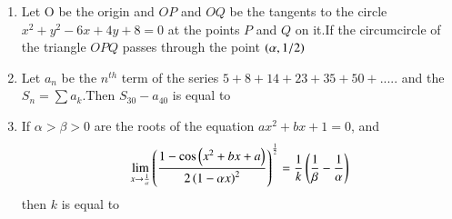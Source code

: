 \documentclass[journal]{IEEEtran}
\numberwithin{equation}{enumi}
\numberwithin{figure}{enumi}
\begin{document}
\begin{enumerate}
        \item Let O be the origin and $OP$ and $OQ$ be the tangents to the circle $x^2+y^2-6x+4y+8=0$ at the points $P$ and $Q$ on it.If the circumcircle of the triangle $OPQ$ passes through the point $\left(\alpha,1/2\right)$  \hfill{}\\
       \begin{enumerate}    
              \end{enumerate}   
       \item Let $a_n$ be the $n^{th}$ term of the series $5+8+14+23+35+50+.....$ and the $S_n =\sum a_k$.Then $S_{30}-a_{40}$ is equal to
        \hfill{}\\
      \begin{enumerate}    
              \end{enumerate}  
               \item If $\alpha>\beta>0$ are the roots of the equation $ax^2 + bx + 1 = 0$, and 
    \begin{align*}
        \lim_{x \to \frac{1}{\alpha}} \left(\frac{1-\cos{\ensuremath{\left(x^2 + bx + a\right)}}}{2\left(1 - \alpha x\right)^2}\right)^{\frac{1}{2}} = \frac{1}{k}\left(\frac{1}{\beta} - \frac{1}{\alpha}\right)
    \end{align*}
    then $k$ is equal to
        \hfill{}\\
        \begin{enumerate}    
\end{enumerate}
\end{enumerate}
\end{document}
